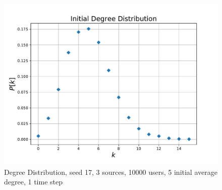 \begin{figure}[htpb]
  \centering
  \includegraphics[width=\columnwidth]{img/pdf/gauss.pdf}
  \caption{Degree Distribution, seed 17, 3 sources, 10000 users, 5 initial average degree, 1 time step}
  \label{fig:gauss}
\end{figure}
